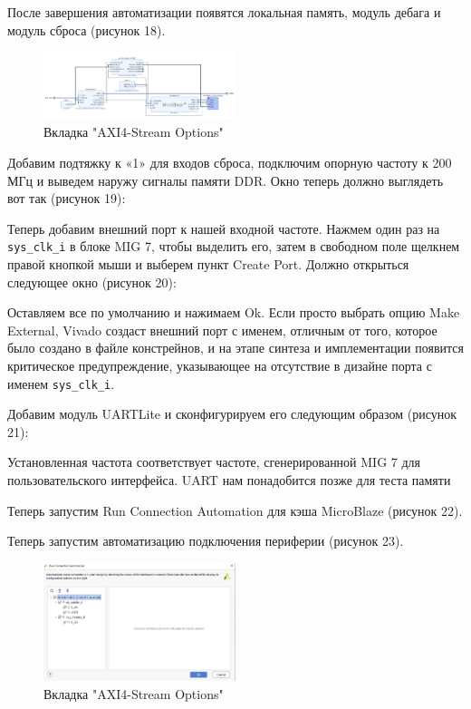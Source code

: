 \documentclass[a4paper,oneside ,14pt]{extreport}
\begin{document}
После завершения автоматизации появятся локальная память, модуль дебага и модуль сброса (рисунок 18).
\begin{figure}[h]
	\centering
	\includegraphics[width=0.5\textwidth]{image/mig_m_1.png}
	\caption{Вкладка "AXI4-Stream Options"}
	\label{mig_m_1}
\end{figure}

Добавим подтяжку к «1» для входов сброса, подключим опорную частоту к 200 МГц и выведем наружу сигналы памяти DDR. Окно теперь должно выглядеть вот так (рисунок 19):

Теперь добавим внешний порт к нашей входной частоте. Нажмем один раз на \verb|sys_clk_i| в блоке MIG 7, чтобы выделить его, затем в свободном поле щелкнем правой кнопкой мыши и выберем пункт Create Port. Должно открыться следующее окно (рисунок 20):

Оставляем все по умолчанию и нажимаем Ok. Если просто выбрать опцию Make External, Vivado создаст внешний порт с именем, отличным от того, которое было создано в файле констрейнов, и на этапе синтеза и имплементации появится критическое предупреждение, указывающее на отсутствие в дизайне порта с именем \verb|sys_clk_i|.

Добавим модуль UARTLite и сконфигурируем его следующим образом (рисунок 21):

    Установленная частота соответствует частоте, сгенерированной MIG 7 для пользовательского интерфейса. UART нам понадобится позже для теста памяти

    Теперь запустим Run Connection Automation для кэша MicroBlaze (рисунок 22).

    Теперь запустим автоматизацию подключения периферии (рисунок 23).
\begin{figure}[h]
	\centering
	\includegraphics[width=0.5\textwidth]{image/mig_m_3.png}
	\caption{Вкладка "AXI4-Stream Options"}
	\label{mig_m_3}
\end{figure}
\end{document}
